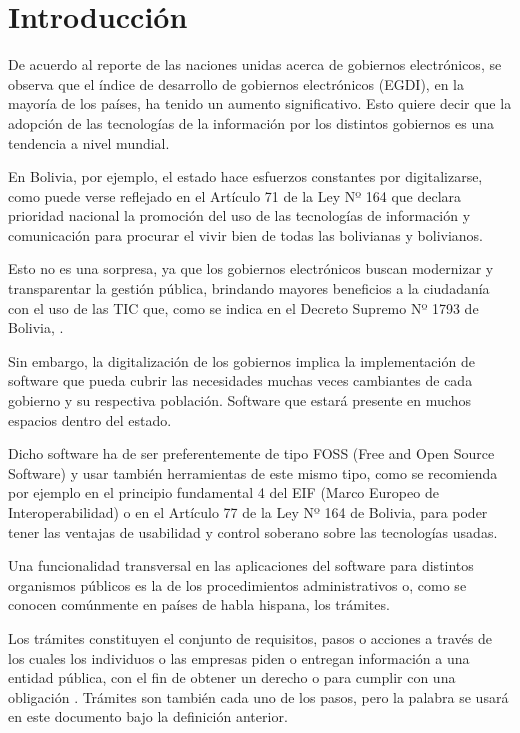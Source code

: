 \section{Introducción}

De acuerdo al reporte de las naciones unidas acerca de gobiernos electrónicos, se observa que el índice de desarrollo de gobiernos electrónicos (EGDI), en la mayoría de los países, ha tenido un aumento significativo. Esto quiere decir que la adopción de las tecnologías de la información por los distintos gobiernos es una tendencia a nivel mundial.

En Bolivia, por ejemplo, el estado hace esfuerzos constantes por digitalizarse, como puede verse reflejado en el Artículo 71 de la Ley Nº 164 que declara prioridad nacional la promoción del uso de las tecnologías de información y comunicación para procurar el vivir bien de todas las bolivianas y bolivianos.

Esto no es una sorpresa, ya que los gobiernos electrónicos buscan modernizar y transparentar la gestión pública, brindando mayores beneficios a la ciudadanía con el uso de las TIC que, como se indica en el Decreto Supremo Nº 1793 de Bolivia, .

Sin embargo, la digitalización de los gobiernos implica la implementación de software que pueda cubrir las necesidades muchas veces cambiantes de cada gobierno y su respectiva población. Software que estará presente en muchos espacios dentro del estado.

Dicho software ha de ser preferentemente de tipo FOSS (Free and Open Source Software) y usar también herramientas de este mismo tipo, como se recomienda por ejemplo en el principio fundamental 4 del EIF (Marco Europeo de Interoperabilidad) o en el Artículo 77 de la Ley Nº 164 de Bolivia, para poder tener las ventajas de usabilidad y control soberano sobre las tecnologías usadas.

Una funcionalidad transversal en las aplicaciones del software para distintos organismos públicos es la de los procedimientos administrativos o, como se conocen comúnmente en países de habla hispana, los trámites.

Los trámites constituyen el conjunto de requisitos, pasos o acciones a través de los cuales los individuos o las empresas piden o entregan información a una entidad pública, con el fin de obtener un derecho o para cumplir con una obligación \cite{rosethFinTramiteEterno2018}. Trámites son también cada uno de los pasos, pero la palabra se usará en este documento bajo la definición anterior.

